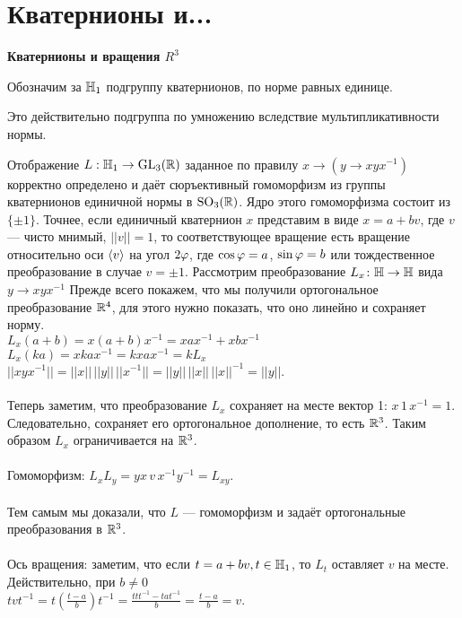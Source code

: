 \section{
 Кватернионы и... %
}

\textbf{Кватернионы и вращения $R^3$}

\dfn Обозначим за $\mathbb{H}_{1}$ подгруппу кватернионов, по норме равных единице.
\edfn

\rm
Это действительно подгруппа по умножению вследствие мультипликативности нормы.
\erm 

\thrm Отображение $L : \mathbb{H}_{1}\to \operatorname{GL}_3(\mathbb{R})$ заданное по правилу $x\to (y \to xyx^{-1})$ корректно определено и даёт сюръективный  гомоморфизм из группы кватернионов единичной нормы в $\operatorname{SO}_3(\mathbb{R})$. Ядро этого гомоморфизма состоит из $\{\pm 1\}$. Точнее, если единичный кватернион $x$  представим в виде $x=a+bv$, {\color{red} где $v$ --- чисто мнимый, $||v|| = 1$}, то соответствующее вращение есть вращение относительно  оси $\left\langle v \right\rangle$ на угол $2\varphi$, где $\cos \varphi= a$, $\sin \varphi= b$ или тождественное преобразование в случае $v=\pm 1$.
\ethrm
\proof Рассмотрим преобразование $L_x \colon \mathbb{H} \to \mathbb{H}$ вида $y \to xyx^{-1}$ Прежде всего покажем, что мы получили ортогональное преобразование $\mathbb{R}^4$, для этого нужно показать, что оно линейно и сохраняет норму.\\
$L_x(a+b) = x (a+b) x^{-1} = xax^{-1} + xbx^{-1}$\\
$L_x(ka) = xkax^{-1} = kxax^{-1} = kL_x$\\
$||xyx^{-1}||= ||x|| \, ||y|| \, ||x^{-1}|| = ||y|| \, ||x|| \, ||x||^{-1} =||y||.$\\
\\
Теперь заметим, что преобразование $L_x$ сохраняет на месте вектор 1: $x \, 1 \, x^{-1} = 1$. Следовательно, сохраняет его ортогональное дополнение, то есть $\mathbb{R}^3$. Таким образом $L_x$ ограничивается на $\mathbb{R}^3$.\\
\\
Гомоморфизм: $L_xL_y= yx \, v \, x^{-1} y^{-1} = L_{xy}$.\\ 
\\
Тем самым мы доказали, что $L$ --- гомоморфизм и задаёт ортогональные преобразования в $\mathbb{R}^3$.\\ 
\\
Ось вращения: заметим, что если $t=a+bv, t \in \mathbb{H}_1$, то $L_{t}$ оставляет $v$ на месте. Действительно, при $b\neq 0$ \\
$tvt^{-1}=t(\frac{t-a}{b})t^{-1}= \frac{ttt^{-1} - tat^{-1}}{b} =  \frac{t-a}{b}=v.$\\
